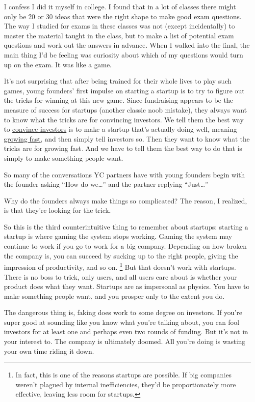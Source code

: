 \documentclass[12pt]{book}
\begin{document}
I confess I did it myself in college. I found that in a lot of classes
there might only be 20 or 30 ideas that were the right shape to make
good exam questions. The way I studied for exams in these classes was
not (except incidentally) to master the material taught in the class,
but to make a list of potential exam questions and work out the answers
in advance. When I walked into the final, the main thing I'd be feeling
was curiosity about which of my questions would turn up on the exam. It
was like a game.

It's not surprising that after being trained for their whole lives to
play such games, young founders' first impulse on starting a startup is
to try to figure out the tricks for winning at this new game. Since
fundraising appears to be the measure of success for startups (another
classic noob mistake), they always want to know what the tricks are for
convincing investors. We tell them the best way to
\href{convince.html}{convince investors} is to make a startup that's
actually doing well, meaning \href{growth.html}{growing fast}, and then
simply tell investors so. Then they want to know what the tricks are for
growing fast. And we have to tell them the best way to do that is simply
to make something people want.

So many of the conversations YC partners have with young founders begin
with the founder asking ``How do we\ldots{}'' and the partner replying
``Just\ldots{}''

Why do the founders always make things so complicated? The reason, I
realized, is that they're looking for the trick.

So this is the third counterintuitive thing to remember about startups:
starting a startup is where gaming the system stops working. Gaming the
system may continue to work if you go to work for a big company.
Depending on how broken the company is, you can succeed by sucking up to
the right people, giving the impression of productivity, and so on.
\footnote{In fact, this is one of the reasons startups are possible. If
big companies weren't plagued by internal inefficiencies, they'd be
proportionately more effective, leaving less room for startups.} But that doesn't work with startups. There is no
boss to trick, only users, and all users care about is whether your
product does what they want. Startups are as impersonal as physics. You
have to make something people want, and you prosper only to the extent
you do.

The dangerous thing is, faking does work to some degree on investors. If
you're super good at sounding like you know what you're talking about,
you can fool investors for at least one and perhaps even two rounds of
funding. But it's not in your interest to. The company is ultimately
doomed. All you're doing is wasting your own time riding it down.
\end{document}
